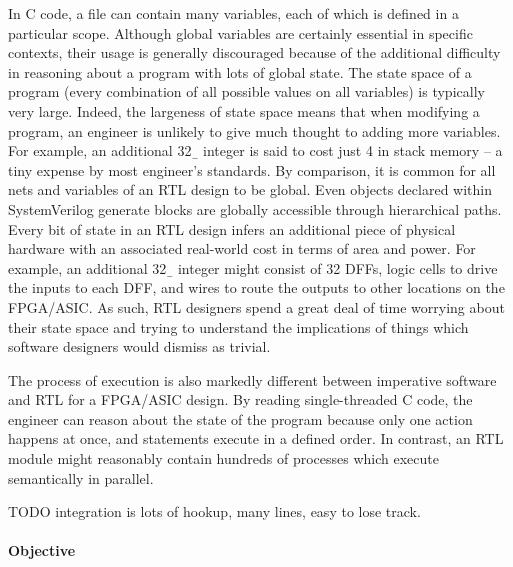 \documentclass[a4paper]{article}
\begin{document}
In C code, a file can contain many variables, each of which is defined in a
particular scope.
Although global variables are certainly essential in specific contexts, their
usage is generally discouraged because of the additional difficulty in
reasoning about a program with lots of global state.
The state space of a program (every combination of all possible values on all
variables) is typically very large.
Indeed, the largeness of state space means that when modifying a program, an
engineer is unlikely to give much thought to adding more variables.
For example, an additional \SI{32}{\b} integer is said to cost just
\SI{4}{\byte} in stack memory -- a tiny expense by most engineer's standards.
By comparison, it is common for all nets and variables of an \gls{RTL} design
to be global.
Even objects declared within SystemVerilog generate blocks are globally
accessible through hierarchical paths.
Every bit of state in an \gls{RTL} design infers an additional piece of
physical hardware with an associated real-world cost in terms of area and
power.
For example, an additional \SI{32}{\b} integer might consist of 32 \glspl{DFF},
logic cells to drive the inputs to each \gls{DFF}, and wires to route the
outputs to other locations on the \gls{FPGA}/\gls{ASIC}.
As such, \gls{RTL} designers spend a great deal of time worrying about their
state space and trying to understand the implications of things which software
designers would dismiss as trivial.

The process of execution is also markedly different between imperative software
and \gls{RTL} for a \gls{FPGA}/\gls{ASIC} design.
By reading single-threaded C code, the engineer can reason about the state of
the program because only one action happens at once, and statements execute in
a defined order.
In contrast, an \gls{RTL} module might reasonably contain hundreds of processes
which execute semantically in parallel.


TODO integration is lots of hookup, many lines, easy to lose track.


\paragraph{Objective} %
\label{sec:HungarianNotation_objective}
\end{document}

